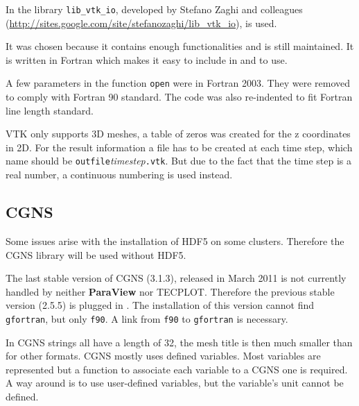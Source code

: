 In \stbtel the library \verb+lib_vtk_io+, developed by Stefano Zaghi and colleagues
(\url{http://sites.google.com/site/stefanozaghi/lib\_vtk\_io}), is used.

It was chosen because it contains enough functionalities and is still
maintained.  It is written in Fortran which makes it easy to include in \stbtel
and to use.

A few parameters in the function \verb+open+ were in Fortran 2003. They were
removed to comply with Fortran 90 standard. The code was also re-indented to
fit Fortran line length standard.

VTK only supports 3D meshes, a table of zeros was created for the z
coordinates in 2D.  For the result information a file has to be created at each
time step, which name should be \verb+outfile+\textit{timestep}\verb+.vtk+. But
due to the fact that the time step is a real number, a continuous numbering is
used instead.

\subsection{CGNS}
Some issues arise with the installation of HDF5 on some clusters.  Therefore
the CGNS library will be used without HDF5.

The last stable version of CGNS (3.1.3), released in March 2011 is not
currently handled by neither \textbf{ParaView} nor TECPLOT. Therefore the
previous stable version (2.5.5) is plugged in \stbtel. The installation of this
version cannot find \verb+gfortran+, but only \verb+f90+.  A link from
\verb+f90+ to \verb+gfortran+ is necessary.

In CGNS strings all have a length of 32, the mesh title is then much smaller
than for other formats.  CGNS mostly uses defined variables. Most \telemacsystem
variables are represented but a function to associate each \telemacsystem variable to a
CGNS one is required. A way around is to use user-defined variables, but the
variable's unit cannot be defined.


